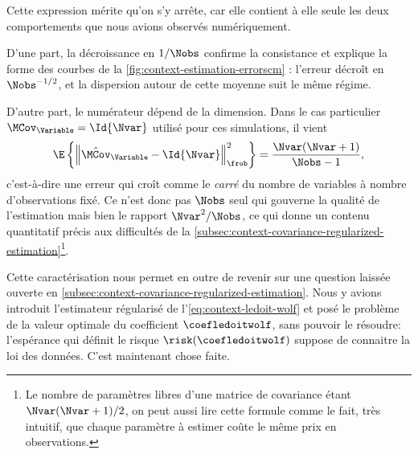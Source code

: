 \begin{remark}
  Cette expression mérite qu'on s'y arrête, car elle contient à elle seule les deux comportements que nous avions observés numériquement.

  D'une part, la décroissance en $1/\Nobs$ confirme la consistance et explique la forme des courbes de la \cref{fig:context-estimation-errorscm} : l'erreur décroît en $\Nobs^{-1/2}$, et la dispersion autour de cette moyenne suit le même régime.

  D'autre part, le numérateur dépend de la dimension. Dans le cas particulier $\MCov_\Variable=\Id{\Nvar}$ utilisé pour ces simulations, il vient
  $$
  \E\left\{\left\|\hat{\MCov}_\Variable - \Id{\Nvar}\right\|_\frob^2\right\}
  =
  \frac{\Nvar(\Nvar+1)}{\Nobs-1},
  $$
  c'est-à-dire une erreur qui croît comme le \emph{carré} du nombre de variables à nombre d'observations fixé. Ce n'est donc pas $\Nobs$ seul qui gouverne la qualité de l'estimation mais bien le rapport $\Nvar^2/\Nobs$, ce qui donne un contenu quantitatif précis aux difficultés de la \cref{subsec:context-covariance-regularized-estimation}\footnote{Le nombre de paramètres libres d'une matrice de covariance étant $\Nvar(\Nvar+1)/2$, on peut aussi lire cette formule comme le fait, très intuitif, que chaque paramètre à estimer coûte le même prix en observations.}.
\end{remark}

Cette caractérisation nous permet en outre de revenir sur une question laissée ouverte en \cref{subsec:context-covariance-regularized-estimation}. Nous y avions introduit l'estimateur régularisé de l'\cref{eq:context-ledoit-wolf} et posé le problème de la valeur optimale du coefficient $\coefledoitwolf$, sans pouvoir le résoudre: l'espérance qui définit le risque $\risk(\coefledoitwolf)$ suppose de connaitre la loi des données. C'est maintenant chose faite.

